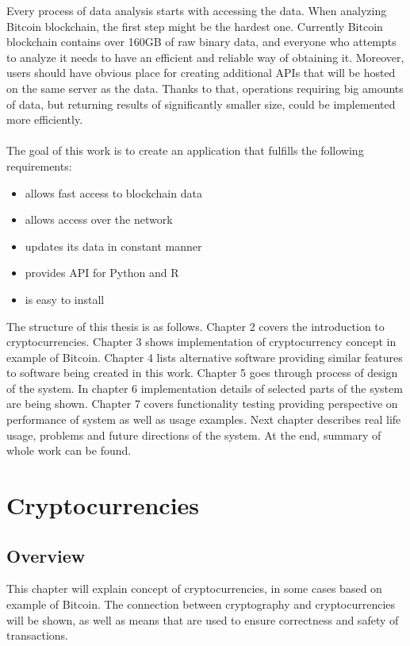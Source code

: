 \documentclass[12pt, en, eng, oneside, final]{mgr}
\begin{document}
Every process of data analysis starts with accessing the data. When analyzing Bitcoin blockchain, the first step might be the hardest one. Currently Bitcoin blockchain contains over 160GB of raw binary data, and everyone who attempts to analyze it needs to have an efficient and reliable way of obtaining it. Moreover, users should have obvious place for creating additional APIs that will be hosted on the same server as the data. Thanks to that, operations requiring big amounts of data, but returning results of significantly smaller size, could be implemented more efficiently.
\\
\\
The goal of this work is to create an application that fulfills the following requirements: 
\begin{itemize}

\item
allows fast access to blockchain data
\item
allows access over the network
\item
updates its data in constant manner
\item
provides API for Python and R
\item
is easy to install

\end{itemize}

The structure of this thesis is as follows. Chapter 2 covers the introduction to cryptocurrencies. Chapter 3 shows implementation of cryptocurrency concept in example of Bitcoin. Chapter 4 lists alternative software providing similar features to software being created in this work. Chapter 5 goes through process of design of the system. In chapter 6 implementation details of selected parts of the system are being shown. Chapter 7 covers functionality testing providing perspective on performance of system as well as usage examples. Next chapter describes real life usage, problems and future directions of the system. At the end, summary of whole work can be found. 

\chapter{Cryptocurrencies}

\section{Overview}
This chapter will explain concept of cryptocurrencies, in some cases based on example of Bitcoin. The connection between cryptography and cryptocurrencies will be shown, as well as means that are used to ensure correctness and safety of transactions.
\end{document}
